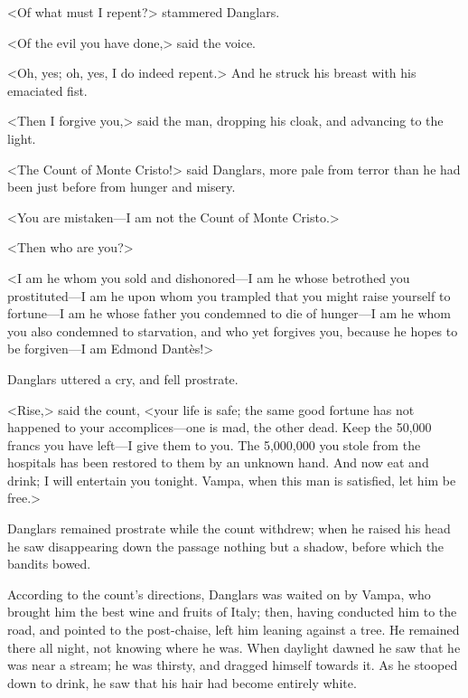  <Of what must I repent?> stammered Danglars. 

 <Of the evil you have done,> said the voice. 

 <Oh, yes; oh, yes, I do indeed repent.> And he struck his breast with his emaciated fist. 

 <Then I forgive you,> said the man, dropping his cloak, and advancing to the light. 

 <The Count of Monte Cristo!> said Danglars, more pale from terror than he had been just before from hunger and misery. 

 <You are mistaken—I am not the Count of Monte Cristo.> 

 <Then who are you?>

<I am he whom you sold and dishonored—I am he whose betrothed you prostituted—I am he upon whom you trampled that you might raise yourself to fortune—I am he whose father you condemned to die of hunger—I am he whom you also condemned to starvation, and who yet forgives you, because he hopes to be forgiven—I am Edmond Dantès!> 

 Danglars uttered a cry, and fell prostrate. 

 <Rise,> said the count, <your life is safe; the same good fortune has not happened to your accomplices—one is mad, the other dead. Keep the 50,000 francs you have left—I give them to you. The 5,000,000 you stole from the hospitals has been restored to them by an unknown hand. And now eat and drink; I will entertain you tonight. Vampa, when this man is satisfied, let him be free.> 

 Danglars remained prostrate while the count withdrew; when he raised his head he saw disappearing down the passage nothing but a shadow, before which the bandits bowed. 

 According to the count's directions, Danglars was waited on by Vampa, who brought him the best wine and fruits of Italy; then, having conducted him to the road, and pointed to the post-chaise, left him leaning against a tree. He remained there all night, not knowing where he was. When daylight dawned he saw that he was near a stream; he was thirsty, and dragged himself towards it. As he stooped down to drink, he saw that his hair had become entirely white. 